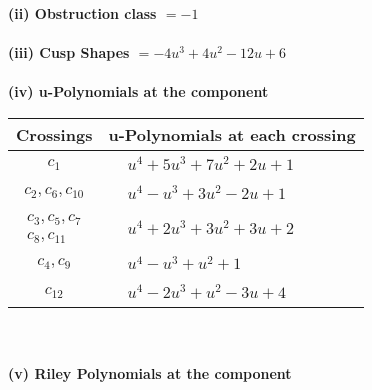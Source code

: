 \documentclass[1p]{elsarticle_modified}
\theoremstyle{definition}
\begin{document}
\flushleft \textbf{(ii) Obstruction class $= -1$}\\~\\
\flushleft \textbf{(iii) Cusp Shapes $= -4 u^3+4 u^2-12 u+6$}\\~\\
\newpage\renewcommand{\arraystretch}{1}
\flushleft \textbf{(iv) u-Polynomials at the component}\newline \\
\begin{tabular}{m{50pt}|m{274pt}}
Crossings & \hspace{64pt}u-Polynomials at each crossing \\
\hline $$\begin{aligned}c_{1}\end{aligned}$$&$\begin{aligned}
&u^4+5 u^3+7 u^2+2 u+1
\end{aligned}$\\
\hline $$\begin{aligned}c_{2},c_{6},c_{10}\end{aligned}$$&$\begin{aligned}
&u^4- u^3+3 u^2-2 u+1
\end{aligned}$\\
\hline $$\begin{aligned}c_{3},c_{5},c_{7}\\c_{8},c_{11}\end{aligned}$$&$\begin{aligned}
&u^4+2 u^3+3 u^2+3 u+2
\end{aligned}$\\
\hline $$\begin{aligned}c_{4},c_{9}\end{aligned}$$&$\begin{aligned}
&u^4- u^3+u^2+1
\end{aligned}$\\
\hline $$\begin{aligned}c_{12}\end{aligned}$$&$\begin{aligned}
&u^4-2 u^3+u^2-3 u+4
\end{aligned}$\\
\hline
\end{tabular}\\~\\
\newpage\renewcommand{\arraystretch}{1}
\flushleft \textbf{(v) Riley Polynomials at the component}\newline \\
\end{document}
